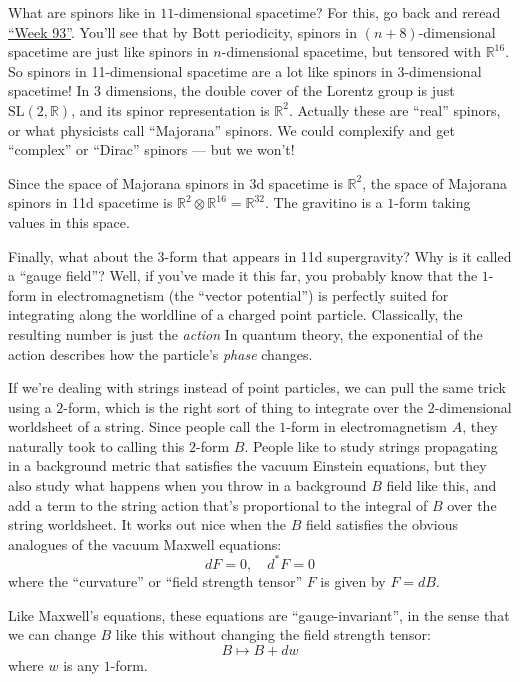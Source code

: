 \documentclass{article}
\begin{document}
What are spinors like in \(11\)-dimensional spacetime? For this, go back
and reread \protect\hyperlink{week93}{``Week 93''}. You'll see that by
Bott periodicity, spinors in \((n+8)\)-dimensional spacetime are just
like spinors in \(n\)-dimensional spacetime, but tensored with
\(\mathbb{R}^{16}\). So spinors in 11-dimensional spacetime are a lot
like spinors in \(3\)-dimensional spacetime! In 3 dimensions, the double
cover of the Lorentz group is just \(\mathrm{SL}(2,\mathbb{R})\), and
its spinor representation is \(\mathbb{R}^2\). Actually these are
``real'' spinors, or what physicists call ``Majorana'' spinors. We could
complexify and get ``complex'' or ``Dirac'' spinors --- but we won't!

Since the space of Majorana spinors in 3d spacetime is \(\mathbb{R}^2\),
the space of Majorana spinors in 11d spacetime is
\(\mathbb{R}^2 \otimes \mathbb{R}^{16} = \mathbb{R}^{32}\). The
gravitino is a \(1\)-form taking values in this space.

Finally, what about the \(3\)-form that appears in 11d supergravity? Why
is it called a ``gauge field''? Well, if you've made it this far, you
probably know that the \(1\)-form in electromagnetism (the ``vector
potential'') is perfectly suited for integrating along the worldline of
a charged point particle. Classically, the resulting number is just the
\emph{action} In quantum theory, the exponential of the action describes
how the particle's \emph{phase} changes.

If we're dealing with strings instead of point particles, we can pull
the same trick using a \(2\)-form, which is the right sort of thing to
integrate over the \(2\)-dimensional worldsheet of a string. Since
people call the \(1\)-form in electromagnetism \(A\), they naturally
took to calling this \(2\)-form \(B\). People like to study strings
propagating in a background metric that satisfies the vacuum Einstein
equations, but they also study what happens when you throw in a
background \(B\) field like this, and add a term to the string action
that's proportional to the integral of \(B\) over the string worldsheet.
It works out nice when the \(B\) field satisfies the obvious analogues
of the vacuum Maxwell equations: \[dF = 0,\quad d^*F = 0\] where the
``curvature'' or ``field strength tensor'' \(F\) is given by \(F=dB\).

Like Maxwell's equations, these equations are ``gauge-invariant'', in
the sense that we can change \(B\) like this without changing the field
strength tensor: \[B \mapsto B + dw\] where \(w\) is any \(1\)-form.
\end{document}

